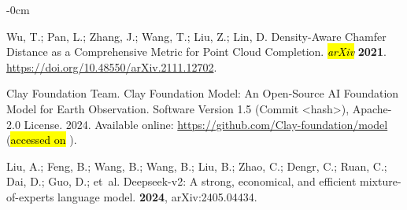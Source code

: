 \documentclass[remotesensing,article,accept,pdftex,moreauthors]{Definitions/mdpi}
\begin{document}
\begin{adjustwidth}{-\extralength}{0cm}
\begin{thebibliography}{999}
Wu, T.; Pan, L.; Zhang, J.; Wang, T.; Liu, Z.; Lin, D.
\newblock Density-Aware Chamfer Distance as a Comprehensive Metric for Point
  Cloud Completion. \emph{\hl{arXiv} %
}  \textbf{2021}.
  {\url{https://doi.org/10.48550/arXiv.2111.12702}}.

{Clay Foundation Team}.
\newblock Clay Foundation Model: An Open-Source AI Foundation Model for Earth
  Observation. Software Version 1.5 (Commit <hash>), Apache-2.0 License. 2024. Available online: 
\newblock \url{https://github.com/Clay-foundation/model} (\hl{accessed on}%
).

Liu, A.; Feng, B.; Wang, B.; Wang, B.; Liu, B.; Zhao, C.; Dengr, C.; Ruan, C.;
  Dai, D.; Guo, D.;  et~al.
\newblock Deepseek-v2: A strong, economical, and efficient mixture-of-experts
  language model.
 {\bf 2024}, arXiv:2405.04434.

\end{thebibliography}

  \PublishersNote{}
  \end{adjustwidth}

\end{document}
